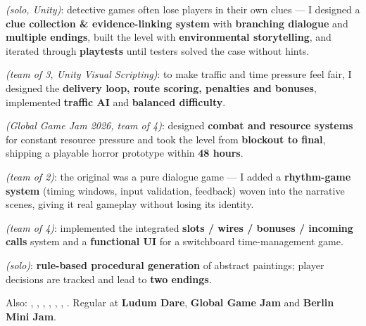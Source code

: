 \documentclass[10pt]{article}
\begin{document}
\begin{points}
  \item {} \textit{(solo, Unity)}:
        detective games often lose players in their own clues --- I designed a \textbf{clue collection \& evidence-linking
        system} with \textbf{branching dialogue} and \textbf{multiple endings}, built the level with \textbf{environmental
        storytelling}, and iterated through \textbf{playtests} until testers solved the case without hints.
  \item {} \textit{(team of 3, Unity Visual Scripting)}:
        to make traffic and time pressure feel fair, I designed the \textbf{delivery loop, route scoring, penalties and
        bonuses}, implemented \textbf{traffic AI} and \textbf{balanced difficulty}.
  \item {} \textit{(Global Game Jam 2026, team of 4)}:
        designed \textbf{combat and resource systems} for constant resource pressure and took the level from
        \textbf{blockout to final}, shipping a playable horror prototype within \textbf{48 hours}.
  \item {} \textit{(team of 2)}:
        the original was a pure dialogue game --- I added a \textbf{rhythm-game system} (timing windows, input validation,
        feedback) woven into the narrative scenes, giving it real gameplay without losing its identity.
  \item {} \textit{(team of 4)}: implemented the integrated \textbf{slots / wires / bonuses /
        incoming calls} system and a \textbf{functional UI} for a switchboard time-management game.
  \item {} \textit{(solo)}: \textbf{rule-based procedural
        generation} of abstract paintings; player decisions are tracked and lead to \textbf{two endings}.
  \item Also: ,
        ,
        ,
        ,
        ,
        ,
        .
        Regular at \textbf{Ludum Dare}, \textbf{Global Game Jam} and \textbf{Berlin Mini Jam}.
\end{points}
\end{document}
